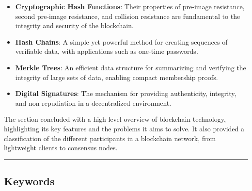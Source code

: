 \begin{itemize}
	\tightlist
	\item
	\textbf{Cryptographic Hash Functions}: Their properties of pre-image
	resistance, second pre-image resistance, and collision resistance are
	fundamental to the integrity and security of the blockchain.
	\item
	\textbf{Hash Chains}: A simple yet powerful method for creating
	sequences of verifiable data, with applications such as one-time
	passwords.
	\item
	\textbf{Merkle Trees}: An efficient data structure for summarizing and
	verifying the integrity of large sets of data, enabling compact
	membership proofs.
	\item
	\textbf{Digital Signatures}: The mechanism for providing authenticity,
	integrity, and non-repudiation in a decentralized environment.
\end{itemize}

The section concluded with a high-level overview of blockchain
technology, highlighting its key features and the problems it aims to
solve. It also provided a classification of the different participants
in a blockchain network, from lightweight clients to consensus nodes.

\begin{center}\rule{0.5\linewidth}{0.5pt}\end{center}

\subsection{Keywords}\label{keywords}

